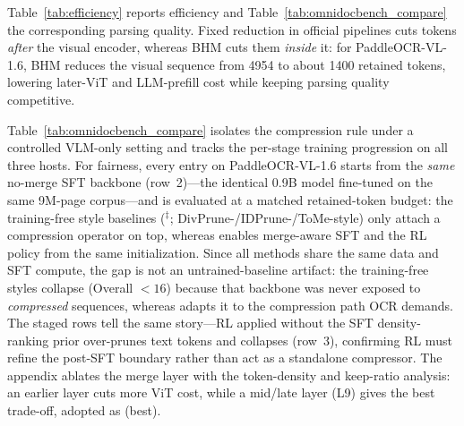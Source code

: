 \begin{table}[t]
\caption{Per-stage training progression and training-free baselines on OmniDocBench v1.6, with the same six-stage progression per host. (1) Official is each host's released implementation; (2) No-merge SFT is the true baseline fine-tuned on our data with no compression (isolating the data effect); (3) applies RL without a merge-aware SFT prior and collapses; (4)--(6) add \ours{} and its RL/post-SFT stages, with (6) Post-SFTthe reported configuration. $^\ddagger$ On PaddleOCR-VL-1.6 we additionally attach training-free compression operators (DivPrune-/IDPrune-/ToMe-style) to the \emph{same} no-merge SFT backbone~(2) at a matched retained-token budget; they collapse because that backbone was never exposed to compressed sequences, whereas \ours{} adapts the backbone to the compression path. $^\dagger$ official implementation; $*$ reproduced by us. Efficiency for these settings is in Table~\ref{tab:efficiency}.}
\label{tab:omnidocbench_compare}
\end{table}

Table~\ref{tab:efficiency} reports efficiency and Table~\ref{tab:omnidocbench_compare} the corresponding parsing quality. Fixed reduction in official pipelines cuts tokens \emph{after} the visual encoder, whereas BHM cuts them \emph{inside} it: for PaddleOCR-VL-1.6, BHM reduces the visual sequence from 4954 to about 1400 retained tokens, lowering later-ViT and LLM-prefill cost while keeping parsing quality competitive.

Table~\ref{tab:omnidocbench_compare} isolates the compression rule under a controlled VLM-only setting and tracks the per-stage training progression on all three hosts. For fairness, every entry on PaddleOCR-VL-1.6 starts from the \emph{same} no-merge SFT backbone (row~2)---the identical 0.9B model fine-tuned on the same 9M-page corpus---and is evaluated at a matched retained-token budget: the training-free style baselines ($^\ddagger$; DivPrune-/IDPrune-/ToMe-style) only attach a compression operator on top, whereas \ours{} enables merge-aware SFT and the RL policy from the same initialization. Since all methods share the same data and SFT compute, the gap is not an untrained-baseline artifact: the training-free styles collapse (Overall $<16$) because that backbone was never exposed to \emph{compressed} sequences, whereas \ours{} adapts it to the compression path OCR demands. The staged rows tell the same story---RL applied without the SFT density-ranking prior over-prunes text tokens and collapses (row~3), confirming RL must refine the post-SFT boundary rather than act as a standalone compressor. The appendix ablates the merge layer with the token-density and keep-ratio analysis: an earlier layer cuts more ViT cost, while a mid/late layer (L9) gives the best trade-off, adopted as \ours{} (best).

